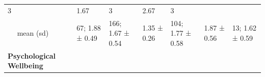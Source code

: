 \documentclass[
  english,
  man,floatsintext]{apa6}
\begin{document}
\begin{longtable}[]{@{}lllllll@{}}
\begin{minipage}[t]{0.12\columnwidth}
3\strut
\end{minipage} & \begin{minipage}[t]{0.10\columnwidth}\raggedright
1.67\strut
\end{minipage} & \begin{minipage}[t]{0.12\columnwidth}\raggedright
3\strut
\end{minipage} & \begin{minipage}[t]{0.10\columnwidth}\raggedright
2.67\strut
\end{minipage} & \begin{minipage}[t]{0.11\columnwidth}\raggedright
3\strut
\end{minipage}\tabularnewline
\begin{minipage}[t]{0.14\columnwidth}\raggedright
~~ mean (sd)\strut
\end{minipage} & \begin{minipage}[t]{0.11\columnwidth}\raggedright
67; 1.88 ± 0.49\strut
\end{minipage} & \begin{minipage}[t]{0.12\columnwidth}\raggedright
166; 1.67 ± 0.54\strut
\end{minipage} & \begin{minipage}[t]{0.10\columnwidth}\raggedright
1.35 ± 0.26\strut
\end{minipage} & \begin{minipage}[t]{0.12\columnwidth}\raggedright
104; 1.77 ± 0.58\strut
\end{minipage} & \begin{minipage}[t]{0.10\columnwidth}\raggedright
1.87 ± 0.56\strut
\end{minipage} & \begin{minipage}[t]{0.11\columnwidth}\raggedright
13; 1.62 ± 0.59\strut
\end{minipage}\tabularnewline
\begin{minipage}[t]{0.14\columnwidth}\raggedright
\textbf{Psychological Wellbeing}\strut
\end{minipage} & \begin{minipage}[t]{0.11\columnwidth}\raggedright
~~\strut
\end{minipage} & \begin{minipage}[t]{0.12\columnwidth}\raggedright
~~\strut
\end{minipage} & \begin{minipage}[t]{0.10\columnwidth}\raggedright
~~\strut
\end{minipage} & \begin{minipage}[t]{0.12\columnwidth}\raggedright

\end{minipage}
\end{longtable}
\end{document}

